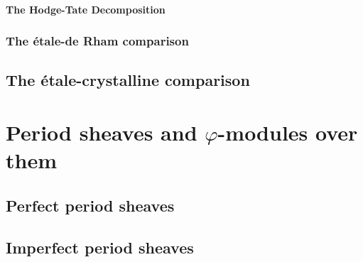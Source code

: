                     \begin{remark}
                        
                    \end{remark}
                
                \paragraph{The Hodge-Tate Decomposition}
            
            \subsubsection{The \'etale-de Rham comparison}
        
        \subsection{The \'etale-crystalline comparison}
    
    \section{Period sheaves and \texorpdfstring{$\varphi$}{}-modules over them}
        \subsection{Perfect period sheaves}
        
        \subsection{Imperfect period sheaves}